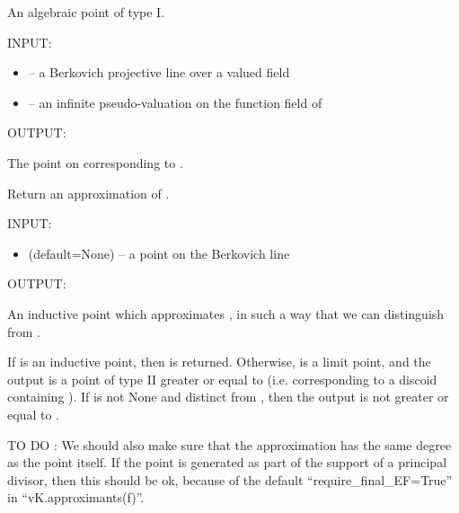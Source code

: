 \documentclass[letterpaper,10pt,english]{sphinxmanual}
\begin{document}

\begin{fulllineitems}
\label{berkovich_line:mclf.berkovich.berkovich_line.TypeIPointOnBerkovichLine}
An algebraic point of type I.

INPUT:
\begin{itemize}
\item {} 
 -- a Berkovich projective line over a valued field 

\item {} 
 -- an infinite pseudo-valuation on the function field of 

\end{itemize}

OUTPUT:

The point on  corresponding to .

\begin{fulllineitems}
\label{berkovich_line:mclf.berkovich.berkovich_line.TypeIPointOnBerkovichLine.approximation}
Return an approximation of .

INPUT:
\begin{itemize}
\item {} 
 (default=None) -- a point on the Berkovich line

\end{itemize}

OUTPUT:

An inductive point which approximates , in such a way that
we can distinguish  from .

If  is an inductive point, then  is returned. Otherwise,
 is a limit point, and the output is a point of type II greater
or equal to  (i.e. corresponding to a discoid containing ).
If  is not None and distinct from , then
the output is not greater or equal to .

TO DO : We should also make sure that the approximation has the same degree
as the point itself. If the point is generated as part of the support of
a principal divisor, then this should be ok, because of the default
``require\_final\_EF=True'' in ``vK.approximants(f)''.


\end{fulllineitems}
\end{fulllineitems}
\end{document}
